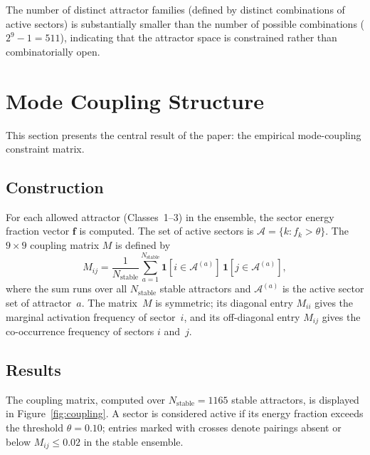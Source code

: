 \documentclass[12pt,a4paper]{article}
\begin{document}
The number of distinct attractor families (defined by distinct
combinations of active sectors) is substantially smaller than the
number of possible combinations ($2^9 - 1 = 511$), indicating that
the attractor space is constrained rather than combinatorially open.


\section{Mode Coupling Structure}\label{sec:coupling}

This section presents the central result of the paper: the empirical
mode-coupling constraint matrix.

\subsection{Construction}

For each allowed attractor (Classes~1--3) in the ensemble, the
sector energy fraction vector $\mathbf{f}$ is computed.  The set of
active sectors is $\mathcal{A} = \{k : f_k > \theta\}$.  The
$9 \times 9$ coupling matrix $M$ is defined by
\begin{equation}\label{eq:coupling}
  M_{ij} = \frac{1}{N_{\mathrm{stable}}}
  \sum_{a=1}^{N_{\mathrm{stable}}}
  \mathbf{1}[i \in \mathcal{A}^{(a)}] \,
  \mathbf{1}[j \in \mathcal{A}^{(a)}],
\end{equation}
where the sum runs over all $N_{\mathrm{stable}}$ stable attractors
and $\mathcal{A}^{(a)}$ is the active sector set of attractor~$a$.
The matrix~$M$ is symmetric; its diagonal entry $M_{ii}$ gives the
marginal activation frequency of sector~$i$, and its off-diagonal
entry $M_{ij}$ gives the co-occurrence frequency of sectors $i$
and~$j$.

\subsection{Results}

The coupling matrix, computed over $N_{\mathrm{stable}} = 1165$
stable attractors, is displayed in Figure~\ref{fig:coupling}.
A sector is considered active if its energy fraction exceeds the
threshold $\theta = 0.10$; entries marked with crosses denote
pairings absent or below $M_{ij} \leq 0.02$ in the stable ensemble.
\end{document}
